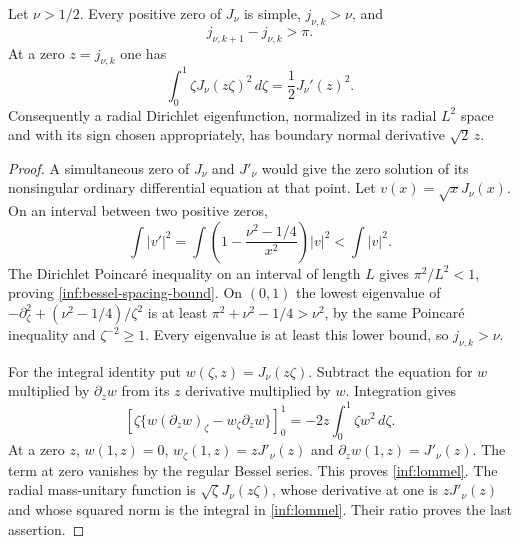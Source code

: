 \begin{lemma}\label{inf:bessel-spacing}
Let $\nu>1/2$. Every positive zero of $J_\nu$ is simple,
$j_{\nu,k}>\nu$, and
\begin{equation}\label{inf:bessel-spacing-bound}
 j_{\nu,k+1}-j_{\nu,k}>\pi.
\end{equation}
At a zero $z=j_{\nu,k}$ one has
\begin{equation}\label{inf:lommel}
 \int_0^1\zeta J_\nu(z\zeta)^2\,d\zeta
 =\frac12J_\nu'(z)^2.
\end{equation}
Consequently a radial Dirichlet eigenfunction, normalized in its radial
$L^2$ space and with its sign chosen appropriately, has boundary
normal derivative $\sqrt2\,z$.
\end{lemma}
\begin{proof}
A simultaneous zero of $J_\nu$ and $J'_\nu$ would give the zero solution
of its nonsingular ordinary differential equation at that point.
Let $v(x)=\sqrt{x}J_\nu(x)$. On an interval between two positive zeros,
\[
 \int |v'|^2=\int\left(1-\frac{\nu^2-1/4}{x^2}\right)|v|^2
 <\int|v|^2.
\]
The Dirichlet Poincar\'e inequality on an interval of length $L$ gives
$\pi^2/L^2<1$, proving \eqref{inf:bessel-spacing-bound}.
On $(0,1)$ the lowest eigenvalue of
$-\partial_\zeta^2+(\nu^2-1/4)/\zeta^2$ is at least
$\pi^2+\nu^2-1/4>\nu^2$, by the same Poincar\'e inequality and
$\zeta^{-2}\ge1$. Every eigenvalue is at least this lower bound, so
$j_{\nu,k}>\nu$.

For the integral identity put $w(\zeta,z)=J_\nu(z\zeta)$.
Subtract the equation for $w$ multiplied by $\partial_z w$ from its
$z$ derivative multiplied by $w$. Integration gives
\[
 [\zeta\{w(\partial_z w)_\zeta-w_\zeta\partial_z w\}]_0^1
 =-2z\int_0^1\zeta w^2\,d\zeta.
\]
At a zero $z$, $w(1,z)=0$, $w_\zeta(1,z)=zJ'_\nu(z)$ and
$\partial_z w(1,z)=J'_\nu(z)$. The term at zero vanishes by the
regular Bessel series. This proves \eqref{inf:lommel}. The radial
mass-unitary function is $\sqrt\zeta J_\nu(z\zeta)$, whose derivative
at one is $zJ'_\nu(z)$ and whose squared norm is the integral in
\eqref{inf:lommel}. Their ratio proves the last assertion.
\end{proof}

